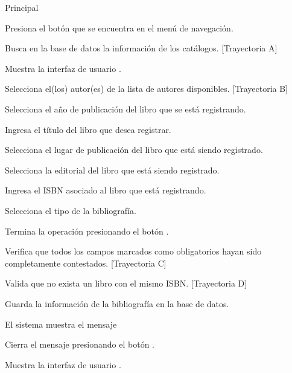 \begin{UCtrayectoria}{Principal}
    
    \UCpaso[\UCactor] Presiona el botón  que se encuentra en el menú de navegación.
    
    \UCpaso Busca en la base de datos la información de los catálogos. [Trayectoria A]
    
    \UCpaso Muestra la interfaz de usuario .

    \UCpaso[\UCactor] Selecciona el(los) autor(es) de la lista de autores disponibles. [Trayectoria B]
    
    \UCpaso[\UCactor] Selecciona el año de publicación del libro que se está registrando.
    
    \UCpaso[\UCactor] Ingresa el título del libro que desea registrar.
    
    \UCpaso[\UCactor] Selecciona el lugar de publicación del libro que está siendo registrado.
    
    \UCpaso[\UCactor] Selecciona la editorial del libro que está siendo registrado.
    
    \UCpaso[\UCactor] Ingresa el ISBN asociado al libro que está registrando. 
    
    \UCpaso[\UCactor] Selecciona el tipo de la bibliografía.

    \UCpaso[\UCactor] Termina la operación presionando el botón .
    
    \UCpaso Verifica que todos los campos marcados como obligatorios hayan sido completamente contestados. [Trayectoria C]
    
    \UCpaso Valida que no exista un libro con el mismo ISBN. [Trayectoria D]
    
    \UCpaso Guarda la información de la bibliografía en la base de datos.
    
    \UCpaso El sistema muestra el mensaje 
    
    \UCpaso[\UCactor] Cierra el mensaje presionando el botón .
    
    \UCpaso Muestra la interfaz de usuario .
\end{UCtrayectoria}


